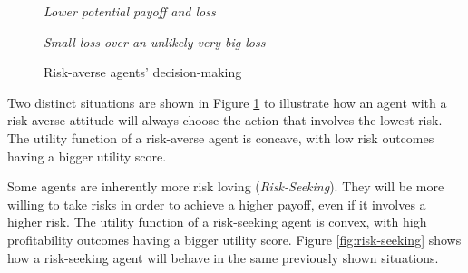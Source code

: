 \begin{figure}[H]
    \centering
    \begin{minipage}{.5\textwidth}
      \centering
        
        \textit{Lower potential payoff and loss}
    \end{minipage}%
    \begin{minipage}{.5\textwidth}
      \centering
        
        \textit{Small loss over an unlikely very big loss}
    \end{minipage}
    \caption{Risk-averse agents' decision-making}
    \label{fig:risk-averse}
\end{figure}

Two distinct situations are shown in Figure \ref{fig:risk-averse} to illustrate how an agent with a risk-averse attitude will always choose the action that involves the lowest risk. The utility function of a risk-averse agent is concave, with low risk outcomes having a bigger utility score.

Some agents are inherently more risk loving (\textit{Risk-Seeking}). They will be more willing to take risks in order to achieve a higher payoff, even if it involves a higher risk. The utility function of a risk-seeking agent is convex, with high profitability outcomes having a bigger utility score. Figure \ref{fig:risk-seeking} shows how a risk-seeking agent will behave in the same previously shown situations.

